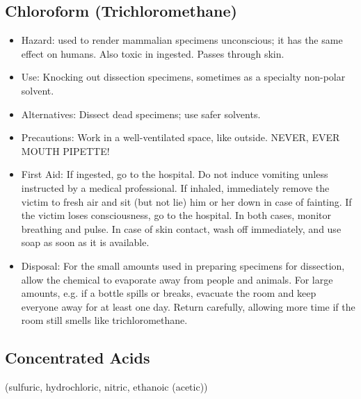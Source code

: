 \subsection{Chloroform (Trichloromethane)}

\begin{itemize}

\item{Hazard: used to render mammalian specimens unconscious; 
it has the same effect on humans. 
Also toxic in ingested. Passes through skin.}

\item{Use: Knocking out dissection specimens, 
sometimes as a specialty non-polar solvent.}

\item{Alternatives: Dissect dead specimens; 
use safer solvents.}

\item{Precautions: Work in a well-ventilated space, like outside. 
NEVER, EVER MOUTH PIPETTE!}

\item{First Aid: If ingested, go to the hospital. 
Do not induce vomiting unless instructed by a medical professional. 
If inhaled, immediately remove the victim to fresh air and sit 
(but not lie) him or her down in case of fainting. 
If the victim loses consciousness, go to the hospital. 
In both cases, monitor breathing and pulse. 
In case of skin contact, wash off immediately, 
and use soap as soon as it is available.}

\item{Disposal: For the small amounts used 
in preparing specimens for dissection, 
allow the chemical to evaporate away from people and animals. 
For large amounts, e.g. if a bottle spills or breaks, 
evacuate the room and keep everyone away for at least one day. 
Return carefully, allowing more time 
if the room still smells like trichloromethane.}

\end{itemize}

\subsection{Concentrated Acids} \label{sub:conc-acids}
(sulfuric, hydrochloric, nitric, ethanoic (acetic))

